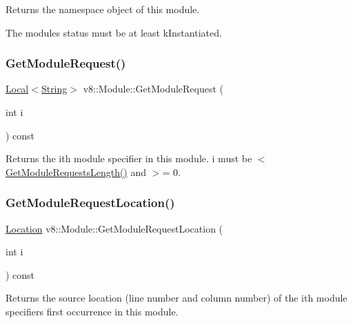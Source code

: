 Returns the namespace object of this module.

The module\textquotesingle{}s status must be at least k\+Instantiated. \mbox{\label{classv8_1_1Module_a3fc072e8a67c08988740ad652ed928af}} 
\subsubsection{\texorpdfstring{Get\+Module\+Request()}{GetModuleRequest()}}
{\footnotesize\ttfamily \mbox{\hyperlink{classv8_1_1Local}{Local}}$<$\mbox{\hyperlink{classv8_1_1String}{String}}$>$ v8\+::\+Module\+::\+Get\+Module\+Request (\begin{DoxyParamCaption}\item[{int}]{i }\end{DoxyParamCaption}) const}

Returns the ith module specifier in this module. i must be $<$ \mbox{\hyperlink{classv8_1_1Module_a323acfb19889ba4e16b81f1c3d89c2b9}{Get\+Module\+Requests\+Length()}} and $>$= 0. \mbox{\label{classv8_1_1Module_a95b5467ac9bcfc120470b6944c7da111}} 
\subsubsection{\texorpdfstring{Get\+Module\+Request\+Location()}{GetModuleRequestLocation()}}
{\footnotesize\ttfamily \mbox{\hyperlink{classv8_1_1Location}{Location}} v8\+::\+Module\+::\+Get\+Module\+Request\+Location (\begin{DoxyParamCaption}\item[{int}]{i }\end{DoxyParamCaption}) const}

Returns the source location (line number and column number) of the ith module specifier\textquotesingle{}s first occurrence in this module. \mbox{\label{classv8_1_1Module_a323acfb19889ba4e16b81f1c3d89c2b9}} 
